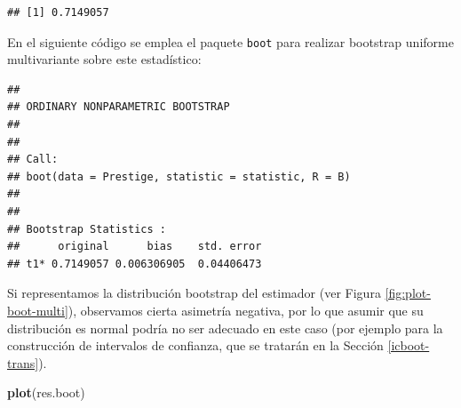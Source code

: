 \documentclass[
]{book}
\newenvironment{Shaded}{\begin{snugshade}}{\end{snugshade}}
\newcommand{\AttributeTok}[1]{\textcolor[rgb]{0.13,0.29,0.53}{#1}}
\newcommand{\CommentTok}[1]{\textcolor[rgb]{0.56,0.35,0.01}{\textit{#1}}}
\newcommand{\ControlFlowTok}[1]{\textcolor[rgb]{0.13,0.29,0.53}{\textbf{#1}}}
\newcommand{\DecValTok}[1]{\textcolor[rgb]{0.00,0.00,0.81}{#1}}
\newcommand{\FunctionTok}[1]{\textcolor[rgb]{0.13,0.29,0.53}{\textbf{#1}}}
\newcommand{\NormalTok}[1]{#1}
\newcommand{\OtherTok}[1]{\textcolor[rgb]{0.56,0.35,0.01}{#1}}
\newcommand{\SpecialCharTok}[1]{\textcolor[rgb]{0.81,0.36,0.00}{\textbf{#1}}}
\theoremstyle{break}
\theoremstyle{nonumberplain}
\renewcommand{\CommentTok}[1]{\textcolor[rgb]{0.41,0.41,0.41}{\texttt{#1}}}
\begin{document}
\begin{Shaded}
\end{Shaded}

\begin{verbatim}
## [1] 0.7149057
\end{verbatim}

En el siguiente código se emplea el paquete \texttt{boot} para realizar bootstrap uniforme multivariante sobre este estadístico:

\begin{Shaded}
\end{Shaded}

\begin{verbatim}
## 
## ORDINARY NONPARAMETRIC BOOTSTRAP
## 
## 
## Call:
## boot(data = Prestige, statistic = statistic, R = B)
## 
## 
## Bootstrap Statistics :
##      original      bias    std. error
## t1* 0.7149057 0.006306905  0.04406473
\end{verbatim}

Si representamos la distribución bootstrap del estimador (ver Figura \ref{fig:plot-boot-multi}), observamos cierta asimetría negativa, por lo que asumir que su distribución es normal podría no ser adecuado en este caso (por ejemplo para la construcción de intervalos de confianza, que se tratarán en la Sección \ref{icboot-trans}).

\begin{Shaded}
\begin{Highlighting}[]
\FunctionTok{plot}\NormalTok{(res.boot)}
\end{Highlighting}
\end{Shaded}
\end{document}
